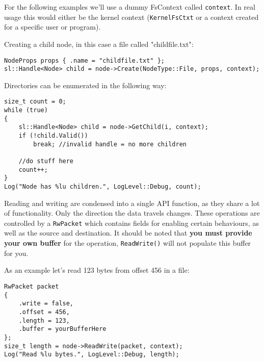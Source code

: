 For the following examples we'll use a dummy FsContext called \verb|context|. In real usage this would either be the kernel context (\verb|KernelFsCtxt| or a context created for a specific user or program).

Creating a child node, in this case a file called "childfile.txt":
\begin{verbatim}
NodeProps props { .name = "childfile.txt" };
sl::Handle<Node> child = node->Create(NodeType::File, props, context);
\end{verbatim}

Directories can be enumerated in the following way:
\begin{verbatim}
size_t count = 0;
while (true)
{
    sl::Handle<Node> child = node->GetChild(i, context);
    if (!child.Valid())
        break; //invalid handle = no more children

    //do stuff here
    count++;
}
Log("Node has %lu children.", LogLevel::Debug, count);
\end{verbatim}

Reading and writing are condensed into a single API function, as they share a lot of functionality. Only the direction the data travels changes. These operations are controlled by a \verb|RwPacket| which contains fields for enabling certain behaviours, as well as the source and destination. It should be noted that \textbf{you must provide your own buffer} for the operation, \verb|ReadWrite()| will not populate this buffer for you.

As an example let's read 123 bytes from offset 456 in a file:
\begin{verbatim}
RwPacket packet 
{
    .write = false,
    .offset = 456,
    .length = 123,
    .buffer = yourBufferHere
};
size_t length = node->ReadWrite(packet, context);
Log("Read %lu bytes.", LogLevel::Debug, length);
\end{verbatim}
